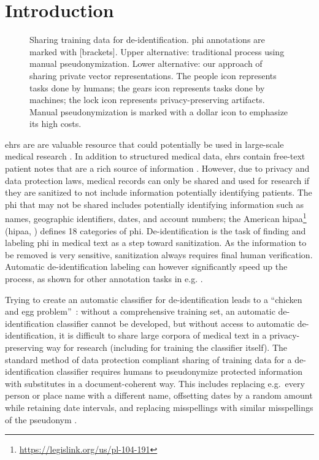 
\section{Introduction}\label{sec:introduction}

\begin{figure*}
    \centering
    
    \caption{Sharing training data for de-identification.
        \ac{phi} annotations are marked with [brackets].
        Upper alternative: traditional process using manual pseudonymization.
        Lower alternative: our approach of sharing private vector representations.
        The people icon represents tasks done by humans; the gears icon represents tasks done by machines; the lock icon represents privacy-preserving artifacts.
        Manual pseudonymization is marked with a dollar icon to emphasize its high costs.
    }\label{fig:process}
\end{figure*}

%
\Acp{ehr} are are valuable resource that could potentially be used in large-scale medical research \citep{botsis2010secondary, birkhead2015uses, cowie2017electronic}.
%
In addition to structured medical data, \acp{ehr} contain free-text patient notes that are a rich source of information \citep{jensen2012mining}.
%
However, due to privacy and data protection laws, medical records can only be shared and used for research if they are sanitized to not include information potentially identifying patients.
%
The \ac{phi} that may not be shared includes potentially identifying information such as names, geographic identifiers, dates, and account numbers; the American \acl{hipaa}\footnote{\url{https://legislink.org/us/pl-104-191}} (\acs{hipaa}, \citeyear{usa1996hipaa}) defines 18 categories of \ac{phi}.
%
De-identification is the task of finding and labeling \ac{phi} in medical text as a step toward sanitization.
%
As the information to be removed is very sensitive, sanitization always requires final human verification.
%
Automatic de-identification labeling can however significantly speed up the process, as shown for other annotation tasks in e.g. \citet{yimam2015narrowing}.

%
Trying to create an automatic classifier for de-identification leads to a ``chicken and egg problem''~\citep{uzuner2007evaluating}: without a comprehensive training set, an automatic de-identification classifier cannot be developed, but without access to automatic de-identification, it is difficult to share large corpora of medical text in a privacy-preserving way for research (including for training the classifier itself).
%
The standard method of data protection compliant sharing of training data for a de-identification classifier requires humans to pseudonymize protected information with substitutes in a document-coherent way.
%
This includes replacing e.g.\ every person or place name with a different name, offsetting dates by a random amount while retaining date intervals, and replacing misspellings with similar misspellings of the pseudonym \cite{uzuner2007evaluating}.

